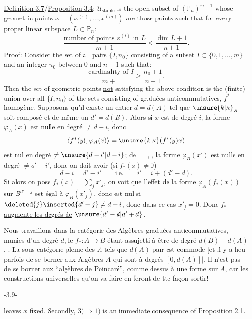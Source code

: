 \uline{Definition 3.7}/\uline{Proposition 3.4}: $\mathcal U_{\mathrm{stable}}$ is the open subset of $(\mathbb P_n)^{m+1}$ whose geometric points $x=(x^{(0)},\ldots,x^{(m)})$ are those points such that for every proper linear subspace $L\subset\overline{\mathbb P}_n$:
\[
\frac{\text{number of points }x^{(i)}\text{ in }L}{m+1}<\frac{\dim L+1}{n+1}.
\]
\uline{Proof}: Consider the set of all pairs $\{I,n_0\}$ consisting of a subset $I\subset\{0,1,\ldots,m\}$ and an integer $n_0$ between 0 and $n-1$ such that:
\[
\frac{\text{cardinality of }I}{m+1}\geq\frac{n_0+1}{n+1}.
\]
Then the set of geometric points \uline{not} satisfying the above condition is the (finite) union over all $\{I,n_0\}$ of the sets consisting of
gr.duées anticommutatives, $f^*$ homogène. Supposons qu'il existe un entier $d=d(A)$ tel que $\unsure{k|\kappa}_A$ soit composé
et de même un $d'=d(B)$. Alors si $x$ est de degré $i$, la forme $\varphi_A(x)$ est nulle en degré $\ne d-i$, donc
\[
\langle f^*(y),\varphi_A(x)\rangle=\unsure{k|\kappa}(f^*(y)x)
\]
est nul en degré $\ne\unsure{d-i'|d-i}$;
 de $=$, , la forme $\varphi_B(x')$ est nulle en degré $\ne d'-i'$, donc on doit avoir (si $f_*(x)\ne0$)
\[
d-i=d'-i'\qquad\text{i.e.}\qquad i'=i+(d'-d).
\]
Si alors on pose $f_*(x)=\sum_jx'_j$, on voit que l'effet de la forme $\varphi_A(f_*(x))$ sur $B^{d'-j}$ est égal à $\varphi_B(x'_j)$, donc est nul si $\deleted{j}\inserted{d'-j}\ne d-i$, donc dans ce cas $x'_j=0$. Donc $f_*$ \uline{augmente les degrés de} $\unsure{d'-d|d'+d}$.

Nous travaillons dans la catégorie  des Algèbres graduées anticommutatives, munies d'un degré $d$, le $f_*:A\longrightarrow B$ étant assujetti à être de degré $d(B)-d(A)$, . La sous catégorie pleine des $A$ tels que $d(A)$ pair est commode [et il y a lieu parfois de se borner aux Algèbres $A$ qui sont à degrés  $[0,d(A)]$]. Il n'est pas  de se borner aux ``algèbres de Poincaré'',  comme dessus à une forme sur $A$, car les constructions universelles qu'on va faire en feront de tte façon sortir!
\begin{center}-3.9-\end{center}
leaves $x$ fixed. Secondly, $3)\Rightarrow1)$ is an immediate consequence of Proposition 2.1.

